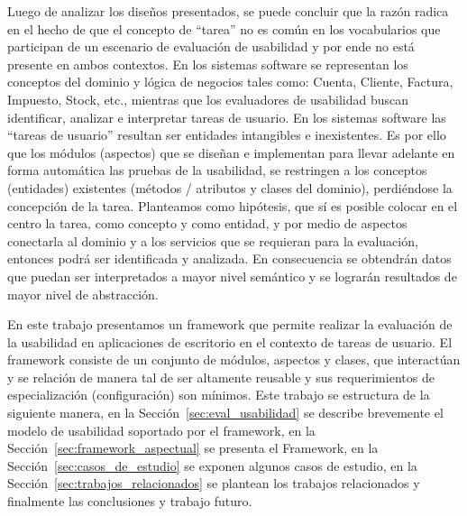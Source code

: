Luego de analizar los diseños presentados, se puede concluir que la razón radica en el hecho de que el concepto de “tarea” no es común en los vocabularios que participan de un escenario de evaluación de usabilidad y por ende no está presente en ambos contextos. En los sistemas software se representan los conceptos del dominio y lógica de negocios tales como: Cuenta, Cliente, Factura, Impuesto, Stock, etc., mientras que los evaluadores de usabilidad buscan identificar, analizar e interpretar  tareas de usuario. En los sistemas software  las “tareas de usuario” resultan ser entidades intangibles e inexistentes. Es por ello que los módulos (aspectos) que se diseñan e implementan para llevar adelante en forma automática las pruebas de la usabilidad, se restringen a los conceptos (entidades) existentes (métodos / atributos y clases del dominio), perdiéndose la concepción de la tarea. Planteamos como hipótesis, que sí es posible colocar en el centro la tarea, como concepto y como entidad, y por medio de aspectos conectarla al dominio y a los servicios que se requieran para la evaluación, entonces podrá ser identificada y analizada. En consecuencia se obtendrán datos que puedan ser interpretados a mayor nivel semántico y se lograrán resultados de mayor nivel de abstracción. 

En este trabajo presentamos un framework que permite realizar la evaluación de la usabilidad en aplicaciones de escritorio en el contexto de tareas de usuario. El framework consiste de un conjunto de módulos, aspectos y clases, que interactúan y se relación de manera tal de ser altamente reusable y sus requerimientos de especialización (configuración) son mínimos. 
Este trabajo se estructura de la siguiente manera, en la Sección~\ref{sec:eval_usabilidad} se describe brevemente el modelo de usabilidad soportado por el framework, en la Sección~\ref{sec:framework_aspectual} se presenta el Framework, en la Sección~\ref{sec:casos_de_estudio} se exponen algunos casos de estudio, en la Sección~\ref{sec:trabajos_relacionados} se plantean los trabajos relacionados y finalmente las conclusiones y trabajo futuro. 
